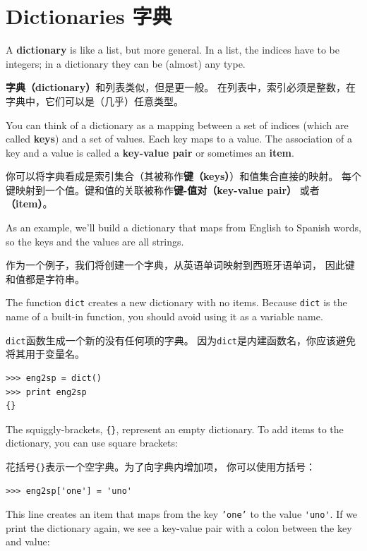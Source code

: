 \documentclass[10pt]{book}
\begin{document}
\begin{CJK}{UTF8}{gbsn}
\begin{exercise}
\begin{enumerate}
\end{enumerate}
\end{exercise}


\chapter{Dictionaries 字典}

A {\bf dictionary} is like a list, but more general.  In a list,
the indices have to be integers; in a dictionary they can
be (almost) any type.

{\bf 字典（dictionary）}和列表类似，但是更一般。
在列表中，索引必须是整数，在字典中，它们可以是（几乎）任意类型。

You can think of a dictionary as a mapping between a set of indices
(which are called {\bf keys}) and a set of values.  Each key maps to a
value.  The association of a key and a value is called a {\bf
  key-value pair} or sometimes an {\bf item}.
  
你可以将字典看成是索引集合（其被称作{\bf 键（keys）}）和值集合直接的映射。
每个键映射到一个值。键和值的关联被称作{\bf 键-值对（key-value pair）}
或者 {\bf （item）}。

As an example, we'll build a dictionary that maps from English
to Spanish words, so the keys and the values are all strings.

作为一个例子，我们将创建一个字典，从英语单词映射到西班牙语单词，
因此键和值都是字符串。

The function {\tt dict} creates a new dictionary with no items.
Because {\tt dict} is the name of a built-in function, you
should avoid using it as a variable name.

{\tt dict}函数生成一个新的没有任何项的字典。
因为{\tt dict}是内建函数名，你应该避免将其用于变量名。

\begin{verbatim}
>>> eng2sp = dict()
>>> print eng2sp
{}
\end{verbatim}

The squiggly-brackets, \verb"{}", represent an empty dictionary.
To add items to the dictionary, you can use square brackets:

花括号\verb"{}"表示一个空字典。为了向字典内增加项，
你可以使用方括号：

\begin{verbatim}
>>> eng2sp['one'] = 'uno'
\end{verbatim}
%
This line creates an item that maps from the key
{\tt 'one'} to the value \verb"'uno'".  If we print the
dictionary again, we see a key-value pair with a colon
between the key and value:


\end{CJK}
\end{document}

